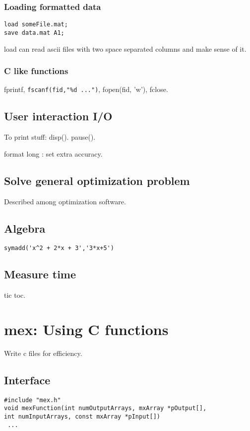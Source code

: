 \documentclass[oneside, article]{memoir}
\begin{document}
\subsubsection{Loading formatted data}
\begin{verbatim}
load someFile.mat;
save data.mat A1;
\end{verbatim}
load can read ascii files with two space separated columns and make sense of it.


\subsubsection{C like functions}
fprintf, \verb'fscanf(fid,"%d ...")', fopen(fid, 'w'), fclose.

\subsection{User interaction I/O}
To print stuff: disp(). pause().

format long : set extra accuracy.

\subsection{Solve general optimization problem}
Described among optimization software.

\subsection{Algebra}
\begin{verbatim}
symadd('x^2 + 2*x + 3','3*x+5')
\end{verbatim}

\subsection{Measure time}
tic toc.

\section{mex: Using C functions}
Write c files for efficiency.

\subsection{Interface}
\begin{verbatim}
#include "mex.h"
void mexFunction(int numOutputArrays, mxArray *pOutput[],
int numInputArrays, const mxArray *pInput[])
 ...
\end{verbatim}
\end{document}
